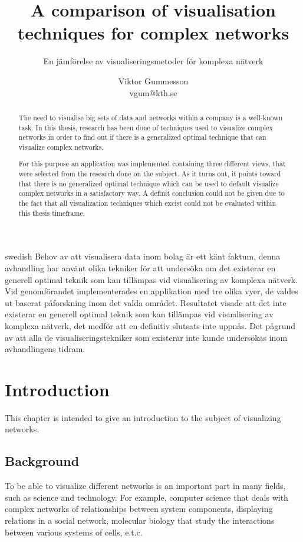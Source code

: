 \documentclass[a4paper,11pt]{kth-mag}
\title{A comparison of visualisation techniques for complex networks}
\subtitle{En j\"amf\"orelse av visualiseringsmetoder f\"or komplexa n\"atverk}
\author{Viktor Gummesson\\ \lowercase{vgum@kth.se}}
\begin{document}
\frontmatter
\pagestyle{empty}
\removepagenumbers
\maketitle
{}
\begin{abstract}
The need to visualise big sets of data and networks within a company is a well-known task. In this thesis, research has been done of techniques used to visualize complex networks in order to find out if there is a 
generalized optimal technique that can visualize complex networks.

For this purpose an application was implemented containing three different views, that were selected from the research done on the subject. As it turns out, it points toward that there is no generalized optimal 
technique which can be used to default visualize complex networks in a satisfactory way. A definit conclusion could not be given due to the fact that all visualization techniques which excist could not be
evaluated within this thesis timeframe.
\end{abstract}
\clearpage
\begin{foreignabstract}{swedish}
Behov av att visualisera data inom bolag \"ar ett k\"ant faktum, denna avhandling har anv\"ant olika tekniker f\"or att unders\"oka om det existerar en generell optimal teknik som kan till\"ampas vid visualisering av komplexa n\"atverk.
 Vid genomf\"orandet implementerades en applikation med tre olika vyer, de valdes ut baserat p\aa \space forskning inom det valda omr\aa det. Resultatet visade att det inte existerar en generell optimal teknik som kan till\"ampas vid
 visualisering av komplexa n\"atverk, det medf\"or att en definitiv slutsats inte uppn\aa s. Det p\aa \space grund av att alla de visualiseringstekniker som existerar inte kunde unders\"okas inom avhandlingens tidram.
\end{foreignabstract}
\clearpage
\tableofcontents*
\mainmatter
\pagestyle{newchap}
\chapter{Introduction}
This chapter is intended to give an introduction to the subject of visualizing networks.
\section{Background}
To be able to visualize different networks is an important part in many fields, such as science and technology. For example, computer science that deals with complex networks of relationships between system components,
displaying relations in a social network, molecular biology that study the interactions between various systems of cells, e.t.c.
\end{document}
